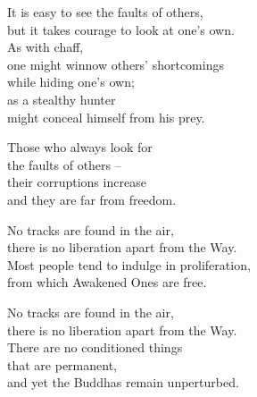 It is easy to see the faults of others,\\
but it takes courage to look at one's own.\\
As with chaff,\\
one might winnow others' shortcomings\\
while hiding one's own;\\
as a stealthy hunter\\
might conceal himself from his prey.


Those who always look for\\
the faults of others --\\
their corruptions increase\\
and they are far from freedom.


No tracks are found in the air,\\
there is no liberation apart from the Way.\\
Most people tend to indulge in proliferation,\\
from which Awakened Ones are free.


No tracks are found in the air,\\
there is no liberation apart from the Way.\\
There are no conditioned things\\
that are permanent,\\
and yet the Buddhas remain unperturbed.

